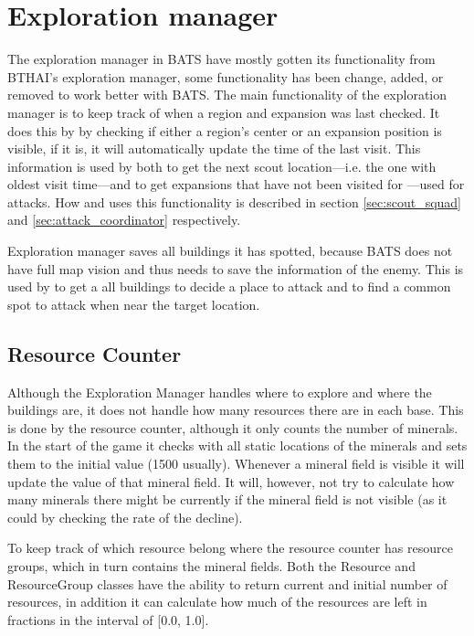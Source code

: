 \section{Exploration manager}
\label{sec:exploration_manager}
The exploration manager in BATS have mostly gotten its functionality from BTHAI’s exploration manager, some functionality has been change, added, or removed to work better with BATS. The main functionality of the exploration manager is to keep track of when a region and expansion was last checked. It does this by by checking if either a region’s center or an expansion position is visible, if it is, it will automatically update the time of the last visit. This information is used by both  to get the next scout location—i.e. the one with oldest visit time—and  to get expansions that have not been visited for \attackCoordinatorExpansionNotCheckedTime—used for attacks. How  and  uses this functionality is described in section \ref{sec:scout_squad} and \ref{sec:attack_coordinator} respectively.

Exploration manager saves all buildings it has spotted, because BATS does not have full map vision and thus needs to save the information of the enemy. This is used by  to get a all buildings to decide a place to attack and  to find a common spot to attack when near the target location.

\subsection{Resource Counter}
\label{sec:resource_counter}
Although the Exploration Manager handles where to explore and where the buildings are, it does not handle how many resources there are in each base. This is done by the resource counter, although it only counts the number of minerals. In the start of the game it checks with all static locations of the minerals and sets them to the initial value (1500 usually). Whenever a mineral field is visible it will update the value of that mineral field. It will, however, not try to calculate how many minerals there might be currently if the mineral field is not visible (as it could by checking the rate of the decline).

To keep track of which resource belong where the resource counter has resource groups, which in turn contains the mineral fields. Both the Resource and ResourceGroup classes have the ability to return current and initial number of resources, in addition it can calculate how much of the resources are left in fractions in the interval of [0.0, 1.0].